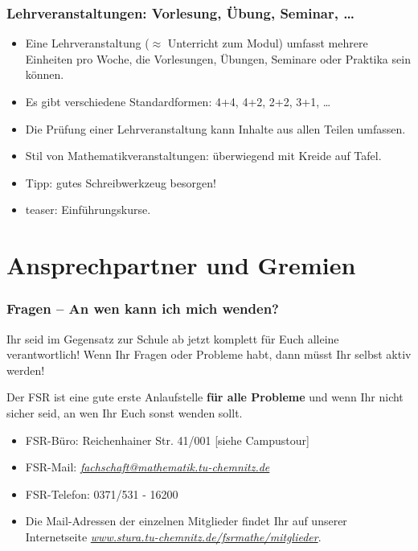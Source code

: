\documentclass[10pt]{beamer}
\begin{document}
\begin{frame}
	\frametitle{Lehrveranstaltungen: Vorlesung, Übung, Seminar, \ldots}

	\begin{itemize}
		\item Eine Lehrveranstaltung ($\approx$ Unterricht zum Modul) umfasst mehrere Einheiten pro Woche, die Vorlesungen, Übungen, Seminare oder Praktika sein können. 
		\item Es gibt verschiedene Standardformen: 4+4, 4+2, 2+2, 3+1, \ldots
		\item Die Prüfung einer Lehrveranstaltung kann Inhalte aus allen Teilen umfassen.
		\item Stil von Mathematikveranstaltungen: überwiegend mit Kreide auf Tafel.
		\item Tipp: gutes Schreibwerkzeug besorgen!
		\item teaser: Einführungskurse.
	\end{itemize}
\end{frame}


\section{Ansprechpartner und Gremien}
\frame{\tableofcontents[currentsection]}

\begin{frame}
	\frametitle{Fragen -- An wen kann ich mich wenden?}

	Ihr seid im Gegensatz zur Schule ab jetzt komplett für Euch alleine verantwortlich! Wenn Ihr Fragen oder Probleme habt, dann müsst Ihr selbst aktiv werden!

	\begin{block}{\vphantom{X}}
		Der FSR ist eine gute erste Anlaufstelle \textbf{für alle Probleme} und wenn Ihr nicht sicher seid, an wen Ihr Euch sonst wenden sollt.
	\end{block}

	\begin{itemize}
		\item FSR-Büro: Reichenhainer Str. 41/001 [siehe Campustour]
		\item FSR-Mail: \textit{\href{mailto:fachschaft@mathematik.tu-chemnitz.de}{fachschaft@mathematik.tu-chemnitz.de}}
		\item FSR-Telefon: 0371/531 - 16200
		\item Die Mail-Adressen der einzelnen Mitglieder findet Ihr auf unserer Internetseite \textit{\href{https://www.stura.tu-chemnitz.de/fsrmathe/mitglieder}{www.stura.tu-chemnitz.de/fsrmathe/mitglieder}}.
	\end{itemize}
\end{frame}
\end{document}
